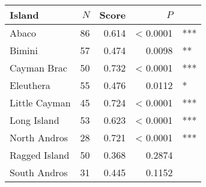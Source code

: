 
\begin{tabular}{lrrrl}
\toprule
Island & $N$ & Score & $P$ & \\
\midrule
Abaco & 86 & 0.614 & < 0.0001 & ***\\
Bimini & 57 & 0.474 & 0.0098 & **\\
Cayman Brac & 50 & 0.732 & < 0.0001 & ***\\
Eleuthera & 55 & 0.476 & 0.0112 & *\\
Little Cayman & 45 & 0.724 & < 0.0001 & ***\\
Long Island & 53 & 0.623 & < 0.0001 & ***\\
North Andros & 28 & 0.721 & < 0.0001 & ***\\
Ragged Island & 50 & 0.368 & 0.2874 & \\
South Andros & 31 & 0.445 & 0.1152 & \\
\bottomrule
\end{tabular}